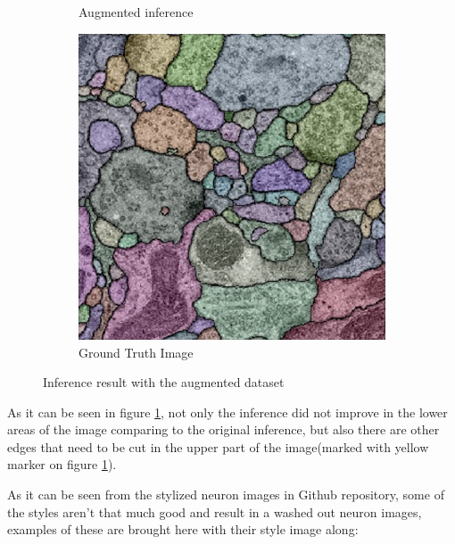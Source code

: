 \documentclass[12pt, a4paper]{scrartcl}
\begin{document}
\begin{figure}[H]
\begin{subfigure}{.3\textwidth}
  \caption{Augmented inference}
  \label{fig:ai2}
\end{subfigure}
\begin{subfigure}{.3\textwidth}
  \centering
  \includegraphics[width=.9\linewidth]{oi3}
  \caption{Ground Truth Image}
  \label{fig:ai3}
\end{subfigure}

\label{fig:augmented_inference}
\caption{Inference result with the augmented dataset}
\end{figure}

As it can be seen in figure \ref{fig:ai2}, not only the inference did not improve in the lower areas of the image comparing to the original inference, but also there are other edges that need to be cut in the upper part of the image(marked with yellow marker on figure \ref{fig:ai2}). %

As it can be seen from the stylized neuron images in Github repository, some of the styles aren't that much good and result in a washed out neuron images, examples of these are brought here with their style image along:
\end{document}
